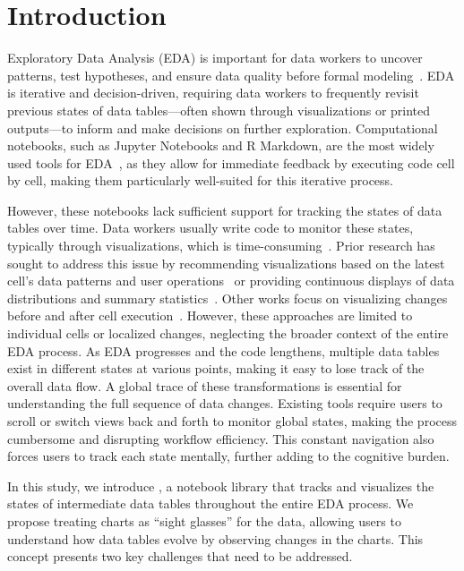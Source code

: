 \section{Introduction}
Exploratory Data Analysis (EDA) is important for data workers to uncover patterns, test hypotheses, and ensure data quality before formal modeling~\cite{wongsuphasawat2019goalsEDA, behrens1997principlesEDA}. 
EDA is iterative and decision-driven, requiring data workers to frequently revisit previous states of data tables—often shown through visualizations or printed outputs—to inform and make decisions on further exploration.  
Computational notebooks, such as Jupyter Notebooks and R Markdown, are the most widely used tools for EDA~\cite{tukey1977exploratory}, as they allow for immediate feedback by executing code cell by cell, making them particularly well-suited for this iterative process.

However, these notebooks lack sufficient support for tracking the states of data tables over time. 
Data workers usually write code to monitor these states, typically through visualizations, which is time-consuming~\cite{2016dataprofile}. 
Prior research has sought to address this issue by recommending visualizations based on the latest cell's data patterns and user operations~\cite{lee2021lux, b2} or providing continuous displays of data distributions and summary statistics~\cite{autoprofiler}. 
Other works focus on visualizing changes before and after cell execution~\cite{datamation}. 
However, these approaches are limited to individual cells or localized changes, neglecting the broader context of the entire EDA process.
As EDA progresses and the code lengthens, multiple data tables exist in different states at various points, making it easy to lose track of the overall data flow. 
A global trace of these transformations is essential for understanding the full sequence of data changes. 
Existing tools require users to scroll or switch views back and forth to monitor global states, making the process cumbersome and disrupting workflow efficiency. 
This constant navigation also forces users to track each state mentally, further adding to the cognitive burden.

In this study, we introduce \system{}, a notebook library that tracks and visualizes the states of intermediate data tables throughout the entire EDA process. We propose treating charts as ``sight glasses'' for the data, allowing users to understand how data tables evolve by observing changes in the charts. This concept presents two key challenges that need to be addressed.

